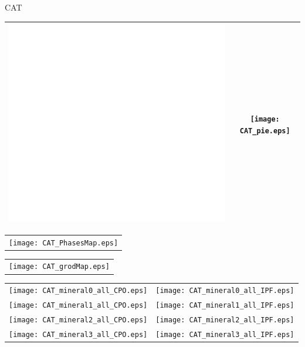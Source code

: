 \documentclass{article}
\newcommand{\framePaper}{
\begin{tikzpicture}[remember picture,overlay] 
 \draw[very thick] 
 ([yshift=-20pt,xshift=20pt]current page.north west)-- 
 ([yshift=-20pt,xshift=-20pt]current page.north east)-- 
 ([yshift=20pt,xshift=-20pt]current page.south east)-- 
 ([yshift=20pt,xshift=20pt]current page.south west)--cycle; 
 \end{tikzpicture}
 }
\begin{document}
 

\newpage



\begin{center}
\huge{CAT}
\end{center}

 \begin{tabular}{c c} 
\hline
\includegraphics[width=0.65\linewidth]{blank.eps} & \texttt{[image: CAT\_pie.eps]} \\
\hline
 \end{tabular}

 \begin{tabular}{c} 
 \texttt{[image: CAT\_PhasesMap.eps]} \\
 \end{tabular} 

\newpage

 \begin{tabular}{c} 
 \texttt{[image: CAT\_grodMap.eps]} \\
 \end{tabular} 

 \begin{tabular}{c c} 
\hline
\texttt{[image: CAT\_mineral0\_all\_CPO.eps]} & \texttt{[image: CAT\_mineral0\_all\_IPF.eps]} \\
\texttt{[image: CAT\_mineral1\_all\_CPO.eps]} & \texttt{[image: CAT\_mineral1\_all\_IPF.eps]} \\
\texttt{[image: CAT\_mineral2\_all\_CPO.eps]} & \texttt{[image: CAT\_mineral2\_all\_IPF.eps]} \\
\texttt{[image: CAT\_mineral3\_all\_CPO.eps]} & \texttt{[image: CAT\_mineral3\_all\_IPF.eps]} \\
\hline
 \end{tabular}
\end{document}
